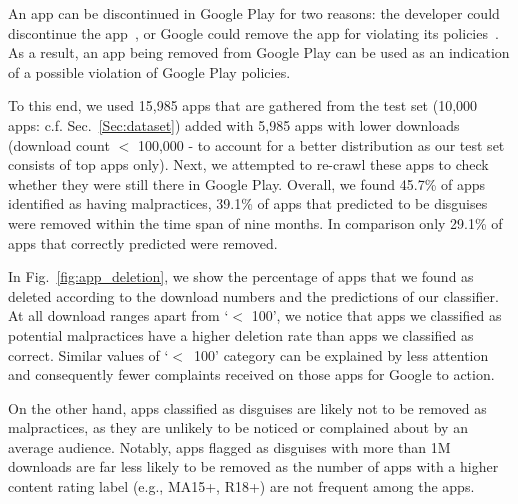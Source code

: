 An app can be discontinued in Google Play for two reasons: the developer could discontinue the app~\cite{denipitiyage2024detecting}, or Google could remove the app for violating its policies~\cite{2023gplypolicyviolation}. As a result, an app being removed from Google Play can be used as an indication of a possible violation of Google Play policies.

To this end, we used 15,985 apps that are gathered from the test set (10,000 apps: c.f. Sec.~\ref{Sec:dataset}) added with 5,985 apps with lower downloads (download count $<$ 100,000 - to account for a better distribution as our test set consists of top apps only). Next, we attempted to re-crawl these apps to check whether they were still there in Google Play. Overall, we found 45.7\% of apps identified as having malpractices, 39.1\% of apps that predicted to be disguises were removed within the time span of nine months. In comparison only  29.1\% of apps that correctly predicted were removed.


In Fig.~\ref{fig:app_deletion}, we show the percentage of apps that we found as deleted according to the download numbers and the predictions of our classifier. At all download ranges apart from `$<$ 100', we notice that apps we classified as potential malpractices have a higher deletion rate than apps we classified as correct. Similar values of `$<$~100' category can be explained by less attention and consequently fewer complaints received on those apps for Google to action.

On the other hand, apps classified as disguises are likely not to be removed as malpractices, as they are unlikely to be noticed or complained about by an average audience. Notably, apps flagged as disguises with more than 1M downloads are far less likely to be removed as the number of apps with a higher content rating label (e.g., MA15+, R18+) are not frequent among the apps. 


